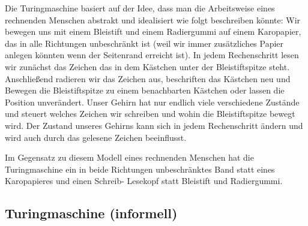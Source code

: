 Die Turingmaschine basiert auf der Idee, dass man die Arbeitsweise eines rechnenden Menschen abstrakt und idealisiert wie folgt beschreiben könnte:
Wir bewegen uns mit einem Bleistift und einem Radiergummi auf einem Karopapier, das in alle Richtungen unbeschränkt ist 
(weil wir immer zusätzliches Papier anlegen könnten wenn der Seitenrand erreicht ist).
In jedem Rechenschritt lesen wir zunächst das Zeichen das in dem Kästchen unter der Bleistiftspitze steht.
Anschließend radieren wir das Zeichen aus, beschriften das Kästchen neu und Bewegen die Bleistiftspitze zu einem benachbarten Kästchen oder 
lassen die Position unverändert. 
Unser Gehirn hat nur endlich viele verschiedene Zustände und steuert welches Zeichen wir schreiben und wohin die Bleistiftspitze bewegt wird.
Der Zustand unseres Gehirns kann sich in jedem Rechenschritt ändern und wird auch durch das gelesene Zeichen beeinflusst.

Im Gegensatz zu diesem Modell eines rechnenden Menschen hat die Turingmaschine ein in beide Richtungen unbeschränktes Band statt eines Karopapieres und einen Schreib- Lesekopf statt Bleistift und Radiergummi.


\subsection{Turingmaschine \normalfont(informell)}

